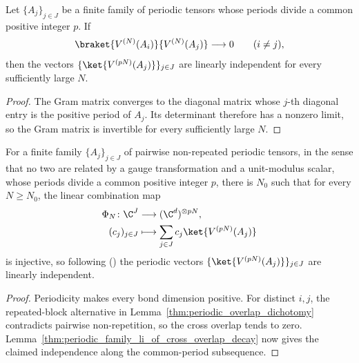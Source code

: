 \begin{lemma}
    \label{thm:periodic_family_li_of_cross_overlap_decay}
    \leanok
    Let $\{A_j\}_{j\in J}$ be a finite family of periodic tensors whose
    periods divide a common positive integer $p$. If
    \begin{align}
        \braket{V^{(N)}(A_i)}{V^{(N)}(A_j)}\longrightarrow0
        \qquad (i\ne j),
        \notag
    \end{align}
    then the vectors $\{\ket{V^{(pN)}(A_j)}\}_{j\in J}$ are linearly
    independent for every sufficiently large $N$.
\end{lemma}
\begin{proof}\leanok
    The Gram matrix converges to the diagonal matrix whose $j$-th diagonal
    entry is the positive period of $A_j$. Its determinant therefore has a
    nonzero limit, so the Gram matrix is invertible for every sufficiently
    large $N$.
\end{proof}

\begin{lemma}%
    \label{thm:periodic_basis_eventually_li}
    \leanok
    For a finite family $\{A_j\}_{j\in J}$ of pairwise non-repeated
    periodic tensors, in the sense that no two are related by a gauge
    transformation and a unit-modulus scalar, whose periods divide a common
    positive integer $p$,
    there is $N_0$ such that for every $N \ge N_0$, the linear combination map
    \begin{align}
        \Phi_N\colon\C^J & \longrightarrow(\C^d)^{\otimes pN},
        \notag                                                 \\
        (c_j)_{j\in J}   & \longmapsto
        \sum_{j\in J}c_j\ket{V^{(pN)}(A_j)}
        \notag
    \end{align}
    is injective, so following \cite[lines~589--609]{DeLasCuevas2017Irreducible}
    (\cite{gap:dccsp17_periodic_overlap_route_alignment}) the periodic vectors
    $\{\ket{V^{(pN)}(A_j)}\}_{j\in J}$ are linearly independent.
\end{lemma}

\begin{proof}\leanok
    Periodicity makes every bond dimension positive. For distinct $i,j$, the
    repeated-block alternative in
    Lemma~\ref{thm:periodic_overlap_dichotomy} contradicts pairwise
    non-repetition, so the cross overlap tends to zero.
    Lemma~\ref{thm:periodic_family_li_of_cross_overlap_decay} now gives the
    claimed independence along the common-period subsequence.
\end{proof}

